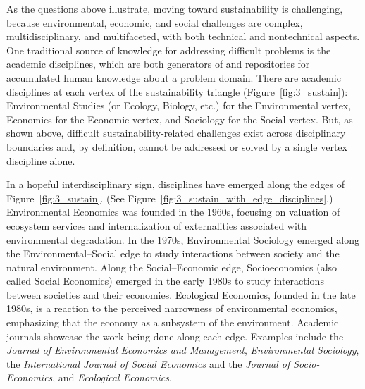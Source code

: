 \documentclass[12pt]{article}
\begin{document}
As the questions above illustrate, 
moving toward sustainability is challenging, 
because environmental, economic, and social challenges  
are complex, multidisciplinary, and multifaceted, with 
both technical and nontechnical aspects.
One traditional source of knowledge for addressing difficult problems is
the academic disciplines, 
which are both generators of and repositories for accumulated human knowledge
about a problem domain.
There are academic disciplines 
at each vertex of the sustainability triangle (Figure~\ref{fig:3_sustain}):
Environmental Studies (or Ecology, Biology, etc.) for the Environmental vertex, 
Economics for the Economic vertex, and 
Sociology for the Social vertex.
But, as shown above, difficult sustainability-related 
challenges exist across disciplinary boundaries and, by definition,
cannot be addressed or solved by a single vertex discipline alone.

In a hopeful interdisciplinary sign, 
disciplines have emerged along the edges of Figure~\ref{fig:3_sustain}.
(See Figure~\ref{fig:3_sustain_with_edge_disciplines}.)
Environmental Economics was founded in the 1960s,
focusing on valuation of ecosystem services and 
internalization of externalities associated with environmental degradation.
In the 1970s, Environmental Sociology emerged along the Environmental--Social edge 
to study interactions between society and the natural environment. 
Along the Social--Economic edge, Socioeconomics (also called Social Economics) 
emerged in the early 1980s
to study interactions between societies and their economies.
Ecological Economics, founded in the late 1980s, 
is a reaction to the perceived narrowness of environmental economics, 
emphasizing that the economy as a subsystem of the environment.
Academic journals showcase the work being done along each edge.
Examples include
the \emph{Journal of Environmental Economics and Management}, 
\emph{Environmental Sociology}, 
the \emph{International Journal of Social Economics} and the \emph{Journal of Socio-Economics}, and
\emph{Ecological Economics}.
\end{document}
